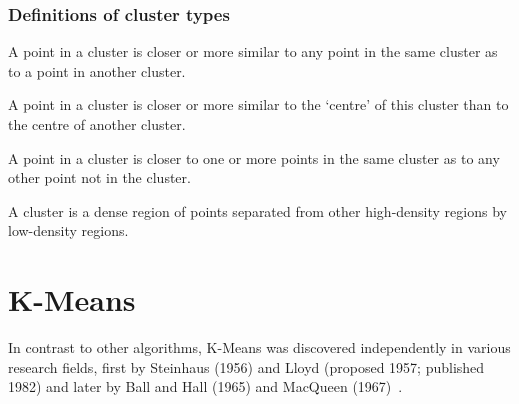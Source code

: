 \documentclass[10pt,twocolumn,letterpaper]{article}
\begin{document}
\subsubsection{Definitions of cluster types~\cite{Joshi2015}}

\begin{definition}
    \label{def:well-separated}
    A point in a cluster is closer or more similar to any point in the same cluster
    as to a point in another cluster.
\end{definition}

\begin{definition}
    \label{def:centre-based}
    A point in a cluster is closer or more similar to the ‘centre’ of this cluster
    than to the centre of another cluster.
\end{definition}

\begin{definition}
    \label{def:contiguous}
    A point in a cluster is closer to one or more points in the same cluster as to
    any other point not in the cluster.
\end{definition}

\begin{definition}
    \label{def:density-based}
    A cluster is a dense region of points separated from other high-density
    regions by low-density regions.
\end{definition}


\section{K-Means}\label{sec:k-means}

In contrast to other algorithms, K-Means was discovered independently in
various research fields, first by Steinhaus (1956) and Lloyd (proposed 1957;
published 1982) and later by Ball and Hall (1965) and MacQueen
(1967)~\cite{Jain2010651}.
\end{document}
